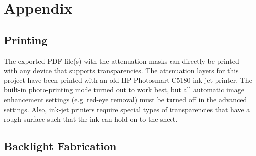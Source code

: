 \chapter{Appendix}
\label{chp:appendix}

\section{Printing}
\label{sec:Printing}

The exported PDF file(s) with the attenuation masks can directly be printed with any device that supports transparencies.
The attenuation layers for this project have been printed with an old HP Photosmart C5180 ink-jet printer.
The built-in photo-printing mode turned out to work best, but all automatic image enhancement settings (e.g. red-eye removal) must be turned off in the advanced settings.
Also, ink-jet printers require special types of transparencies that have a rough surface such that the ink can hold on to the sheet.

\section{Backlight Fabrication}
\label{sec:backlight_fabrication}

